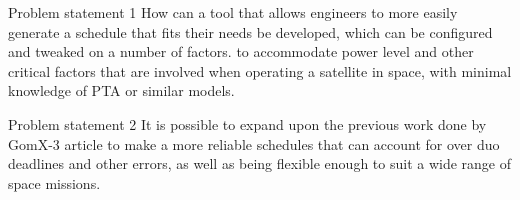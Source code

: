 Problem statement 1
How can a tool that allows engineers to more easily generate a schedule that fits their needs be developed, which can be configured and tweaked on a number of factors. to accommodate power level and other critical factors that are involved when operating a satellite in space, with minimal knowledge of PTA or similar models.

Problem statement 2
It is possible to expand upon the previous work done by GomX-3 article to make a more reliable schedules that can account for over duo deadlines and other errors, as well as being flexible enough to suit a wide range of space missions.



	



